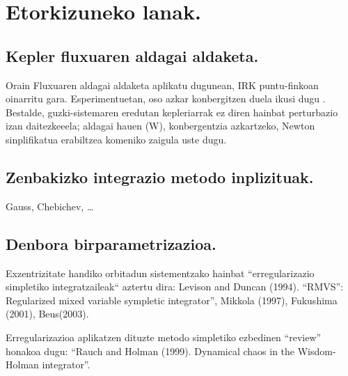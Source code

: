 \section{Etorkizuneko lanak.}

\subsection*{Kepler fluxuaren aldagai aldaketa.}

Orain Fluxuaren aldagai aldaketa aplikatu dugunean, IRK puntu-finkoan oinarritu gara. Esperimentuetan, oso azkar konbergitzen duela ikusi dugu . Bestalde, guzki-sistemaren eredutan kepleriarrak ez diren hainbat perturbazio izan daitezkeeela; aldagai hauen (W), konbergentzia
azkartzeko, Newton sinplifikatua erabiltzea komeniko zaigula uste dugu.

\subsection*{Zenbakizko integrazio metodo inplizituak.}

Gauss, Chebichev, \dots 

\subsection*{Denbora birparametrizazioa.}

Exzentrizitate handiko orbitadun sistementzako hainbat “erregularizazio simpletiko integratzaileak“ aztertu dira:
Levison and Duncan (1994). “RMVS”: Regularized mixed variable sympletic integrator”, Mikkola (1997), Fukushima (2001), Beus(2003).

Erregularizazioa aplikatzen dituzte metodo simpletiko ezbedinen “review” honakoa dugu: “Rauch
and Holman (1999). Dynamical chaos in the Wisdom-Holman integrator”.


